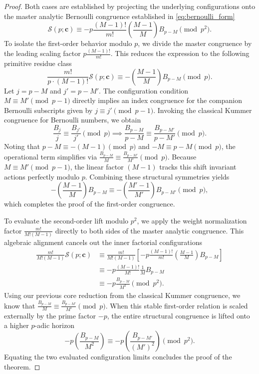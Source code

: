\documentclass[12pt]{amsart}
\theoremstyle{definition}
\begin{document}
\begin{proof}
Both cases are established by projecting the underlying configurations onto the master analytic Bernoulli congruence established in \eqref{eq:bernoulli_form}
\begin{equation*}
    \mathcal{S}(p; \mathbf{c}) \equiv -p \frac{(M-1)!}{m!} \left( \frac{M-1}{M} \right) B_{p-M} \pmod{p^2}.
\end{equation*}
To isolate the first-order behavior modulo $p$, we divide the master congruence by the leading scaling factor $p \frac{(M-1)!}{m!}$. This reduces the expression to the following primitive residue class
\begin{equation*}
    \frac{m!}{p \cdot (M-1)!} \mathcal{S}(p; \mathbf{c}) \equiv -\left( \frac{M-1}{M} \right) B_{p-M} \pmod p.
\end{equation*}
Let $j = p-M$ and $j' = p-M'$. The configuration condition $M \equiv M' \pmod{p-1}$ directly implies an index congruence for the companion Bernoulli subscripts given by $j \equiv j' \pmod{p-1}$. Invoking the classical Kummer congruence for Bernoulli numbers, we obtain
\begin{equation*}
    \frac{B_j}{j} \equiv \frac{B_{j'}}{j'} \pmod p \implies \frac{B_{p-M}}{p-M} \equiv \frac{B_{p-M'}}{p-M'} \pmod p.
\end{equation*}
Noting that $p-M \equiv -(M-1) \pmod p$ and $-M \equiv p-M \pmod p$, the operational term simplifies via $\frac{B_{p-M}}{M} \equiv \frac{B_{p-M'}}{M'} \pmod p$. Because $M \equiv M' \pmod{p-1}$, the linear factor $(M-1)$ tracks this shift invariant actions perfectly modulo $p$. Combining these structural symmetries yields
\begin{equation*}
    -\left( \frac{M-1}{M} \right) B_{p-M} \equiv -\left( \frac{M'-1}{M'} \right) B_{p-M'} \pmod p,
\end{equation*}
which completes the proof of the first-order congruence.

To evaluate the second-order lift modulo $p^2$, we apply the weight normalization factor $\frac{m!}{M!(M-1)}$ directly to both sides of the master analytic congruence. This algebraic alignment cancels out the inner factorial configurations
\begin{align*}
    \frac{m!}{M!(M-1)} \mathcal{S}(p; \mathbf{c}) &\equiv \frac{m!}{M!(M-1)} \left[ -p \frac{(M-1)!}{m!} \left( \frac{M-1}{M} \right) B_{p-M} \right] \\
    &\equiv -p \frac{(M-1)!}{M!} \frac{1}{M} B_{p-M} \\
    &\equiv -p \frac{B_{p-M}}{M^2} \pmod{p^2}.
\end{align*}
Using our previous core reduction from the classical Kummer congruence, we know that $\frac{B_{p-M}}{M} \equiv \frac{B_{p-M'}}{M'} \pmod p$. When this stable first-order relation is scaled externally by the prime factor $-p$, the entire structural congruence is lifted onto a higher $p$-adic horizon
\begin{equation*}
    -p \left( \frac{B_{p-M}}{M^2} \right) \equiv -p \left( \frac{B_{p-M'}}{(M')^2} \right) \pmod{p^2}.
\end{equation*}
Equating the two evaluated configuration limits concludes the proof of the theorem.
\end{proof}
\end{document}
